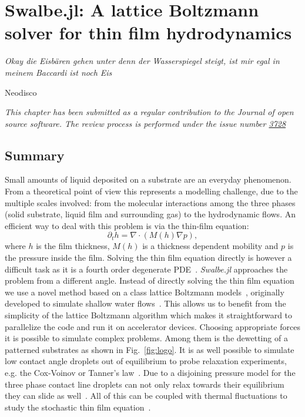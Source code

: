 \chapter{Swalbe.jl: A lattice Boltzmann solver for thin film hydrodynamics}
\label{chapter:fourth_paper}
\epigraph{\textit{Okay die Eisbären gehen unter denn der Wasserspiegel steigt, ist mir egal in meinem Baccardi ist noch Eis}}{Neodisco}

\textit{\small{This chapter has been submitted as a regular contribution to the Journal of open source software. The review process is performed under the issue number \href{https://github.com/openjournals/joss-reviews/issues/3728}{3728}}}

\section{Summary}

Small amounts of liquid deposited on a substrate are an everyday phenomenon.
From a theoretical point of view this represents a modelling challenge, due to the multiple scales involved: from the molecular interactions among the three phases (solid substrate, liquid film and surrounding gas) to the hydrodynamic flows.
An efficient way to deal with this problem is via the thin-film equation:
\begin{equation}\label{eq:thin_film_Joss}
    \partial_t h = \nabla\cdot(M(h)\nabla p),
\end{equation}
where $h$ is the film thickness, $M(h)$ is a thickness dependent mobility and $p$ is the pressure inside the film.
Solving the thin film equation directly is however a difficult task as it is a fourth order degenerate PDE~\cite{becker2003complex}.
\textit{Swalbe.jl} approaches the problem from a different angle.
Instead of directly solving the thin film equation we use a novel method based on a class lattice Boltzmann models~\cite{krueger2017}, originally developed to simulate shallow water flows~\cite{Salmon:1999:0022-2402:503}.
This allows us to benefit from the simplicity of the lattice Boltzmann algorithm which makes it straightforward to parallelize the code and run it on accelerator devices.
Choosing appropriate forces it is possible to simulate complex problems.
Among them is the dewetting of a patterned substrates as shown in Fig.~\ref{fig:logo}.
It is as well possible to simulate low contact angle droplets out of equilibrium to probe relaxation experiments, e.g. the Cox-Voinov or Tanner's law~\cite{RevModPhys.81.739}.
Due to a disjoining pressure model for the three phase contact line droplets can not only relax towards their equilibrium they can slide as well~\cite{PhysRevE.100.033313}.
All of this can be coupled with thermal fluctuations to study the stochastic thin film equation~\cite{shah_van_steijn_kleijn_kreutzer_2019}.

